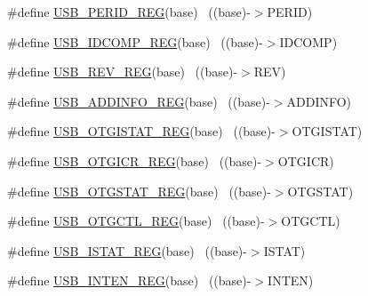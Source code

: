 \begin{DoxyCompactItemize}
\item 
\#define \hyperlink{group___u_s_b___register___accessor___macros_gaf7ac61d8729d7357b45ebb18042334e5}{U\+S\+B\+\_\+\+P\+E\+R\+I\+D\+\_\+\+R\+EG}(base)                                        ~((base)-\/$>$P\+E\+R\+ID)
\item 
\#define \hyperlink{group___u_s_b___register___accessor___macros_ga4ea3ccb3fd6a83a960e21b2a07fa78a4}{U\+S\+B\+\_\+\+I\+D\+C\+O\+M\+P\+\_\+\+R\+EG}(base)                                      ~((base)-\/$>$I\+D\+C\+O\+MP)
\item 
\#define \hyperlink{group___u_s_b___register___accessor___macros_gab7585eeb9bce74c027e9c8de01789e66}{U\+S\+B\+\_\+\+R\+E\+V\+\_\+\+R\+EG}(base)                                            ~((base)-\/$>$R\+EV)
\item 
\#define \hyperlink{group___u_s_b___register___accessor___macros_gad4babec546f000e557c561d031504513}{U\+S\+B\+\_\+\+A\+D\+D\+I\+N\+F\+O\+\_\+\+R\+EG}(base)                                    ~((base)-\/$>$A\+D\+D\+I\+N\+FO)
\item 
\#define \hyperlink{group___u_s_b___register___accessor___macros_gad864de812bd346fc2c67bb93e75de5bb}{U\+S\+B\+\_\+\+O\+T\+G\+I\+S\+T\+A\+T\+\_\+\+R\+EG}(base)                                  ~((base)-\/$>$O\+T\+G\+I\+S\+T\+AT)
\item 
\#define \hyperlink{group___u_s_b___register___accessor___macros_gabb95027a64757ad6dd1ede1d71e5189e}{U\+S\+B\+\_\+\+O\+T\+G\+I\+C\+R\+\_\+\+R\+EG}(base)                                      ~((base)-\/$>$O\+T\+G\+I\+CR)
\item 
\#define \hyperlink{group___u_s_b___register___accessor___macros_ga32e34f54ace5fad23a69c81cab333ca1}{U\+S\+B\+\_\+\+O\+T\+G\+S\+T\+A\+T\+\_\+\+R\+EG}(base)                                    ~((base)-\/$>$O\+T\+G\+S\+T\+AT)
\item 
\#define \hyperlink{group___u_s_b___register___accessor___macros_ga06fe688c6865edd89882b91cc194330d}{U\+S\+B\+\_\+\+O\+T\+G\+C\+T\+L\+\_\+\+R\+EG}(base)                                      ~((base)-\/$>$O\+T\+G\+C\+TL)
\item 
\#define \hyperlink{group___u_s_b___register___accessor___macros_gab6ac8d1d423f3e1a470be14236d70a4e}{U\+S\+B\+\_\+\+I\+S\+T\+A\+T\+\_\+\+R\+EG}(base)                                        ~((base)-\/$>$I\+S\+T\+AT)
\item 
\#define \hyperlink{group___u_s_b___register___accessor___macros_ga449f9c03283cd7a1b78126211670fcf8}{U\+S\+B\+\_\+\+I\+N\+T\+E\+N\+\_\+\+R\+EG}(base)                                        ~((base)-\/$>$I\+N\+T\+EN)

\end{DoxyCompactItemize}
